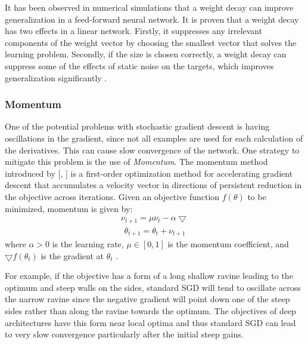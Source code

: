  It has been observed in numerical simulations that a weight decay can improve generalization in a feed-forward neural network. It is proven that a weight decay has two effects in a linear network. Firstly, it suppresses any irrelevant components of the weight vector by choosing the smallest vector that solves the learning problem. Secondly, if the size is chosen correctly, a weight decay can suppress some of the effects of static noise on the targets, which improves generalization significantly \cite{moody1995simple}. 

\subsubsection{Momentum}
One of the potential problems with stochastic gradient descent is having oscillations in the gradient, since not all examples are used for each calculation of the derivatives. This can cause slow convergence of the network. One strategy to mitigate this problem is the use of \textit{Momentum}. The momentum method introduced by [\citeauthor{polyak1964some}, \citeyear{polyak1964some}] is a first-order optimization method for accelerating gradient descent that accumulates a velocity vector in directions of persistent reduction in the objective across iterations. Given an objective function $f(\theta)$ to be minimized, momentum is given by:
\begin{equation}
	\label{eq:t}
	\begin{aligned}
		\nu_{t+1} = \mu\nu_t - \alpha\bigtriangledown 
	\end{aligned}
\end{equation}
\begin{equation}
	\label{eq:t}
	\begin{gathered}
	\theta_{t+1} = \theta_t + \nu_{t + 1}
	\end{gathered}
\end{equation}
where $\alpha > 0$ is the learning rate, $\mu \in [0,1]$ is the momentum coefficient, and $\bigtriangledown f(\theta_t)$ is the gradient at $\theta_t$ \cite{sutskever2013importance}. 

For example, if the objective has a form of a long shallow ravine leading to the optimum and steep walls on the sides, standard SGD will tend to oscillate across the narrow ravine since the negative gradient will point down one of the steep sides rather than along the ravine towards the optimum\cite{sgd}. The objectives of deep architectures have this form near local optima and thus standard SGD can lead to very slow convergence particularly after the initial steep gains. 

